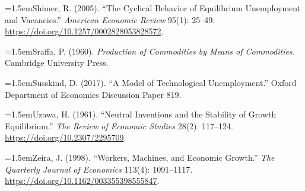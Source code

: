 \documentclass[12pt]{article}
\theoremstyle{plain}
\newcommand{\refentry}[1]{\par\hangindent=1.5em\hangafter=1\noindent #1}
\begin{document}
{\refentry{Shimer, R. (2005). ``The Cyclical Behavior of Equilibrium Unemployment and Vacancies.'' \emph{American Economic Review} 95(1): 25--49. \url{https://doi.org/10.1257/0002828053828572}.}
\refentry{Sraffa, P. (1960). \emph{Production of Commodities by Means of Commodities.} Cambridge University Press.}
\refentry{Susskind, D. (2017). ``A Model of Technological Unemployment.'' Oxford Department of Economics Discussion Paper 819.}
\refentry{Uzawa, H. (1961). ``Neutral Inventions and the Stability of Growth Equilibrium.'' \emph{The Review of Economic Studies} 28(2): 117--124. \url{https://doi.org/10.2307/2295709}.}
\refentry{Zeira, J. (1998). ``Workers, Machines, and Economic Growth.'' \emph{The Quarterly Journal of Economics} 113(4): 1091--1117. \url{https://doi.org/10.1162/003355398555847}.}\par
}
\end{document}
